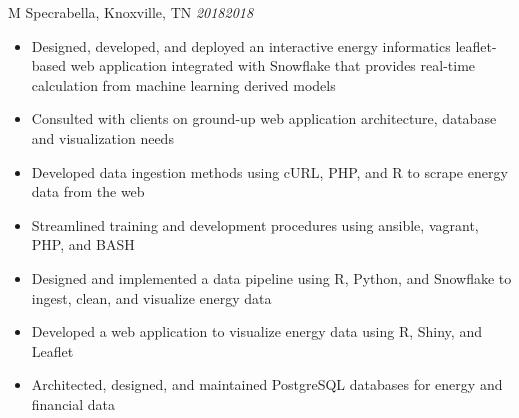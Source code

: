 \documentclass[10pt]{article}%
\begin{document}
\begin{tabularx}{\linewidth}{M}
        Specrabella, Knoxville, TN \textit{2018\textemdash{}2018} \\
        \begin{itemize}[topsep=-12pt,parsep=0em]
            \setlength\itemsep{0em}
            \item Designed, developed, and deployed an interactive energy informatics leaflet-based web application integrated with Snowflake that provides real-time calculation from machine learning derived models %
            \item Consulted with clients on ground-up web application architecture, database and visualization needs%
            \item Developed data ingestion methods using cURL, PHP, and R to scrape energy data from the web %
            \item Streamlined training and development procedures using ansible, vagrant, PHP, and BASH %
            \item Designed and implemented a data pipeline using R, Python, and Snowflake to ingest, clean, and visualize energy data %
            \item Developed a web application to visualize energy data using R, Shiny, and Leaflet %
            \item Architected, designed, and maintained PostgreSQL databases for energy and financial data %
        \end{itemize}
        \end{tabularx}
\end{document}
